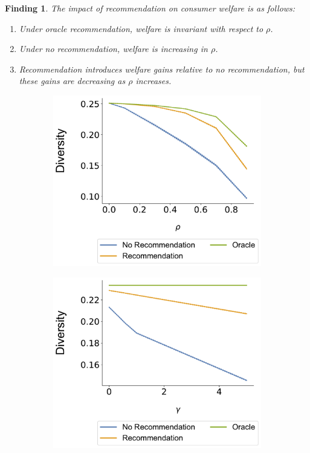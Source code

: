 \documentclass[sigconf]{acmart}
\newtheorem{finding}{Finding}
\begin{document}
\begin{finding}\label{finding_welfare_gap}
The impact of recommendation on consumer welfare is as follows:
\begin{enumerate}
\item Under oracle recommendation, welfare is invariant with respect to $\rho$.
\item Under no recommendation, welfare is increasing in $\rho$.
\item Recommendation introduces welfare gains relative to no recommendation, but these gains are decreasing as $\rho$ increases.
\end{enumerate}
\end{finding}

 

\begin{figure}[t]
\centering
\begin{subfigure}{0.42\linewidth}
  \includegraphics[width=1.0\linewidth]{figures/rho_diversity_N_200_T_20.pdf}
\end{subfigure} \hspace{20pt}
\begin{subfigure}{0.42\linewidth}
\includegraphics[width=1.0\linewidth]{figures/gamma_diversity_N_200_T_20}

\end{subfigure}
\end{figure}
\end{document}
